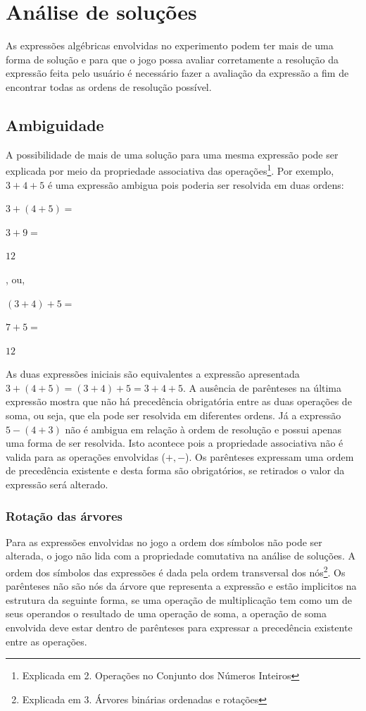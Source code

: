 \chapter{Análise de soluções}
As expressões algébricas envolvidas no experimento podem ter mais de uma forma de solução e para que o jogo possa avaliar corretamente a resolução da expressão feita pelo usuário é necessário fazer a avaliação da expressão a fim de encontrar todas as ordens de resolução possível.

\section{Ambiguidade}
A possibilidade de mais de uma solução para uma mesma expressão pode ser explicada por meio da propriedade associativa das operações\footnote{Explicada em 2. Operações no Conjunto dos Números Inteiros}. Por exemplo, $3+4+5$ é uma expressão ambigua pois poderia ser resolvida em duas ordens:

$3+(4+5)=$ 

$3+9=$

$12$

, ou,

$(3+4)+5=$

$7+5=$

$12$
     
As duas expressões iniciais são equivalentes a expressão apresentada $3+(4+5)=(3+4)+5=3+4+5$. A ausência de parênteses na última expressão mostra que não há precedência obrigatória entre as duas operações de soma, ou seja, que ela pode ser resolvida em diferentes ordens. Já a expressão $5-(4+3)$ não é ambigua em relação à ordem de resolução e possui apenas uma forma de ser resolvida. Isto acontece pois a propriedade associativa não é valida para as operações envolvidas ($+,-$). Os parênteses expressam uma ordem de precedência existente e desta forma são obrigatórios, se retirados o valor da expressão será alterado.

\subsection{Rotação das árvores}
Para as expressões envolvidas no jogo a ordem dos símbolos não pode ser alterada, o jogo não lida com a propriedade comutativa na análise de soluções. A ordem dos símbolos das expressões é dada pela ordem transversal dos nós\footnote{Explicada em 3. Árvores binárias ordenadas e rotações}. Os parênteses não são nós da árvore que representa a expressão e estão implicitos na estrutura da seguinte forma, se uma operação de multiplicação tem como um de seus operandos o resultado de uma operação de soma, a operação de soma envolvida deve estar dentro de parênteses para expressar a precedência existente entre as operações.

